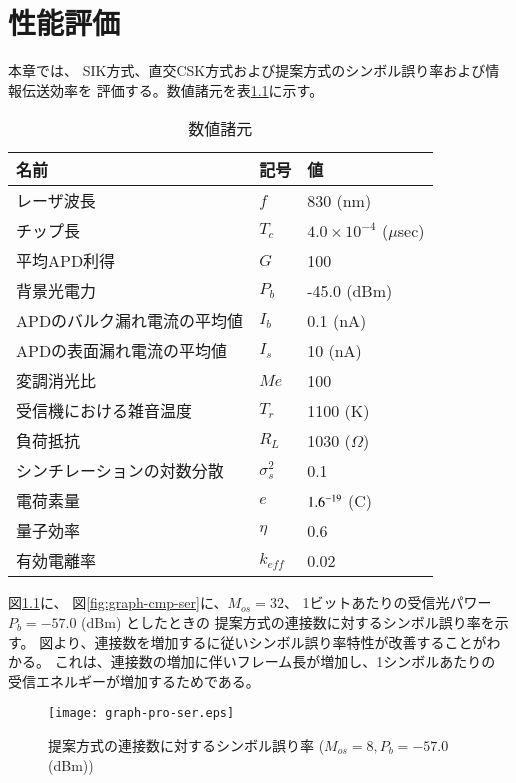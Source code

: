 ﻿\chapter{性能評価}
本章では、
SIK方式、直交CSK方式および提案方式のシンボル誤り率および情報伝送効率を
評価する。数値諸元を表\ref{tbl:parameters}に示す。
\begin{center}
\begin{table}[hpbt]
 \caption{数値諸元}
 \label{tbl:parameters}
 \begin{center}
  \begin{tabular}{l|l|l} \hline
名前 & 記号 & 値 \\ \hline
レーザ波長 & $f$ & 830 (nm) \\
チップ長 & $T_c$ & $4.0 \times 10^{-4}$ ($\mu$sec)\\
平均APD利得 & $G$ & 100 \\
背景光電力 & $ P_b$ & -45.0 (dBm) \\
APDのバルク漏れ電流の平均値 & $I_b$ & 0.1 (nA) \\
APDの表面漏れ電流の平均値 & $I_s$ & 10 (nA) \\
変調消光比 & $Me$ & 100 \\ 
受信機における雑音温度 & $T_r$ & 1100 (K) \\
負荷抵抗 & $R_L$ & 1030 ($\Omega$) \\
シンチレーションの対数分散 & $\sigma_s^2$ & 0.1 \\
電荷素量 & $e$ & $1.6 \time 10^{-19}$ (C)\\
量子効率 & $\eta$ & 0.6 \\
有効電離率 & $k_{eff}$ & 0.02 \\ \hline
  \end{tabular}
 \end{center}
\end{table}
\end{center}

図\ref{fig:graph-proposal-ser}に、
図\ref{fig:graph-cmp-ser}に、$M_{os}=32$、
1ビットあたりの受信光パワー$P_b=-57.0$ (dBm) としたときの
提案方式の連接数に対するシンボル誤り率を示す。
図より、連接数を増加するに従いシンボル誤り率特性が改善することがわかる。
これは、連接数の増加に伴いフレーム長が増加し、1シンボルあたりの
受信エネルギーが増加するためである。
%
\begin{figure}[hpbt]
\begin{center}
  \texttt{[image: graph-pro-ser.eps]}
\caption{提案方式の連接数に対するシンボル誤り率
($M_{os} = 8, P_{b}=-57.0$ (dBm))}
\label{fig:graph-proposal-ser}
\end{center}
\end{figure}
%


